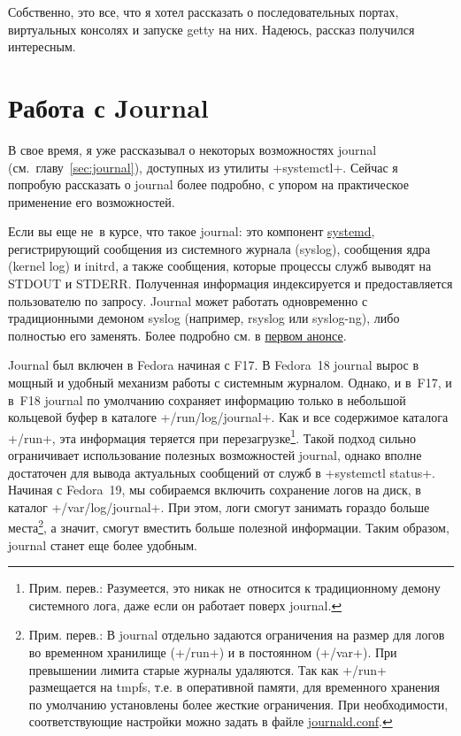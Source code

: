 \documentclass[10pt,oneside,a4paper]{article}
\begin{document}
Собственно, это все, что я хотел рассказать о последовательных портах,
виртуальных консолях и запуске getty на них. Надеюсь, рассказ получился
интересным.

\section{Работа с Journal}

В свое время, я уже рассказывал о некоторых возможностях journal
(см.~главу~\ref{sec:journal}), доступных из утилиты +systemctl+. Сейчас я
попробую рассказать о journal более подробно, с упором на практическое
применение его возможностей.

Если вы еще не~в курсе, что такое journal: это компонент
\href{http://www.freedesktop.org/wiki/Software/systemd}{systemd}, регистрирующий
сообщения из системного журнала (syslog), сообщения ядра (kernel log) и initrd,
а также сообщения, которые процессы служб выводят на STDOUT и STDERR. Полученная
информация индексируется и предоставляется пользователю по запросу. Journal
может работать одновременно с традиционными демоном syslog (например, rsyslog
или syslog-ng), либо полностью его заменять. Более подробно см. в
\href{http://0pointer.de/blog/projects/the-journal.html}{первом анонсе}.

Journal был включен в Fedora начиная с F17. В Fedora~18 journal вырос в мощный и
удобный механизм работы с системным журналом. Однако, и в~F17, и в~F18 journal
по умолчанию сохраняет информацию только в небольшой кольцевой буфер в каталоге
+/run/log/journal+. Как и все содержимое каталога +/run+, эта информация
теряется при перезагрузке\footnote{Прим. перев.: Разумеется, это никак
не~относится к традиционному демону системного лога, даже если он работает
поверх journal.}. Такой подход сильно ограничивает использование
полезных возможностей journal, однако вполне достаточен для вывода актуальных
сообщений от служб в +systemctl status+. Начиная с Fedora~19, мы собираемся
включить сохранение логов на диск, в каталог +/var/log/journal+. При этом,
логи смогут занимать гораздо больше места\footnote{Прим. перев.: В journal
отдельно задаются ограничения на размер для логов во временном хранилище
(+/run+) и в постоянном (+/var+). При превышении лимита старые журналы
удаляются. Так как +/run+ размещается на tmpfs, т.е. в
оперативной памяти, для временного хранения по умолчанию установлены более
жесткие ограничения. При необходимости, соответствующие настройки можно задать
в файле
\href{http://www.freedesktop.org/software/systemd/man/journald.conf.html}{journald.conf}.},
а значит, смогут вместить больше полезной информации. Таким образом, journal
станет еще более удобным.
\end{document}
